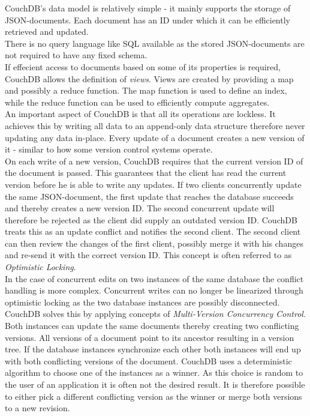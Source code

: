 CouchDB's data model is relatively simple - it mainly supports the storage of JSON-documents.
Each document has an ID under which it can be efficiently retrieved and updated.\\
There is no query language like SQL available as the stored JSON-documents are not required to have any fixed schema.\\
If effecient access to documents based on some of its properties is required, CouchDB allows the definition of \emph{views}.
Views are created by providing a map and possibly a reduce function.
The map function is used to define an index, while the reduce function can be used to efficiently compute aggregates.\\

An important aspect of CouchDB is that all its operations are lockless.
It achieves this by writing all data to an append-only data structure therefore never updating any data in-place.
Every update of a document creates a new version of it - similar to how some version control systems operate.\\
On each write of a new version, CouchDB requires that the current version ID of the document is passed.
This guarantees that the client has read the current version before he is able to write any updates.
If two clients concurrently update the same JSON-document, the first update that reaches the database succeeds and thereby creates a new version ID.
The second concurrent update will therefore be rejected as the client did supply an outdated version ID.
CouchDB treats this as an update conflict and notifies the second client.
The second client can then review the changes of the first client, possibly merge it with his changes and re-send it with the correct version ID.
This concept is often referred to as \emph{Optimistic Locking}.\\

In the case of concurrent edits on two instances of the same database the conflict handling is more complex.
Concurrent writes can no longer be linearized through optimistic locking as the two database instances are possibly disconnected.
CouchDB solves this by applying concepts of \emph{Multi-Version Concurrency Control}.
Both instances can update the same documents thereby creating two conflicting versions.
All versions of a document point to its ancestor resulting in a version tree.
If the database instances synchronize each other both instances will end up with both conflicting versions of the document.
CouchDB uses a deterministic algorithm to choose one of the instances as a winner.
As this choice is random to the user of an application it is often not the desired result.
It is therefore possible to either pick a different conflicting version as the winner or merge both versions to a new revision.

